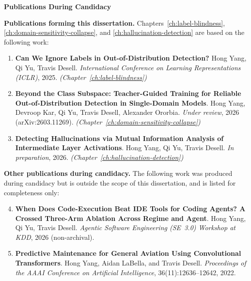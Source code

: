 
\newpage
\thispagestyle{plain}
\sloppy
\begin{center}
  {\large \textbf{Publications During Candidacy}}
\end{center}
\medskip

\textbf{Publications forming this dissertation.}
Chapters~\ref{ch:label-blindness}, \ref{ch:domain-sensitivity-collapse}, and
\ref{ch:hallucination-detection} are based on the following work:

\begin{enumerate}
  \item \textbf{Can We Ignore Labels in Out-of-Distribution Detection?}
        Hong Yang, Qi Yu, Travis Desell. \emph{International Conference on
        Learning Representations (ICLR)}, 2025.
        \hfill \textit{(Chapter~\ref{ch:label-blindness})}

  \item \textbf{Beyond the Class Subspace: Teacher-Guided Training for Reliable
        Out-of-Distribution Detection in Single-Domain Models}.
        Hong Yang, Devroop Kar, Qi Yu, Travis Desell, Alexander Ororbia.
        \emph{Under review}, 2026 (arXiv:2603.11269).
        \hfill \textit{(Chapter~\ref{ch:domain-sensitivity-collapse})}

  \item \textbf{Detecting Hallucinations via Mutual Information Analysis of
        Intermediate Layer Activations}. Hong Yang, Qi Yu, Travis Desell.
        \emph{In preparation}, 2026.
        \hfill \textit{(Chapter~\ref{ch:hallucination-detection})}
\end{enumerate}

\medskip
\textbf{Other publications during candidacy.}
The following work was produced during candidacy but is outside the scope of
this dissertation, and is listed for completeness only:

\begin{enumerate}\setcounter{enumi}{3}
  \item \textbf{When Does Code-Execution Beat IDE Tools for Coding Agents? A
        Crossed Three-Arm Ablation Across Regime and Agent}.
        Hong Yang, Qi Yu, Travis Desell.
        \emph{Agentic Software Engineering (SE~3.0) Workshop at KDD}, 2026
        (non-archival).

  \item \textbf{Predictive Maintenance for General Aviation Using Convolutional
        Transformers}. Hong Yang, Aidan LaBella, and Travis Desell.
        \emph{Proceedings of the AAAI Conference on Artificial Intelligence},
        36(11):12636--12642, 2022.
\end{enumerate}
\fussy
